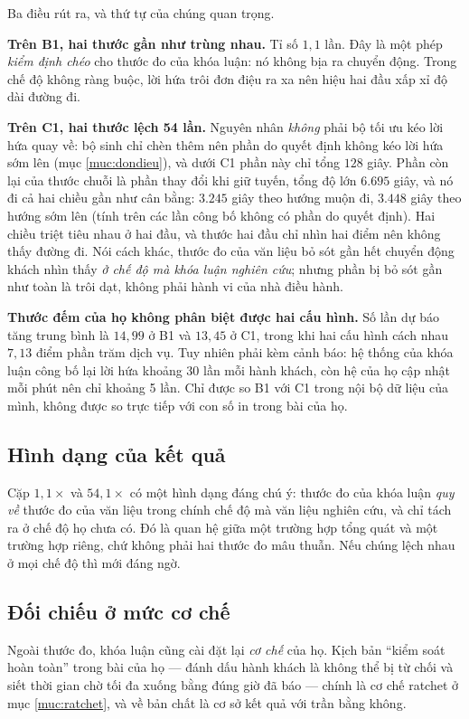 Ba điều rút ra, và thứ tự của chúng quan trọng.

\textbf{Trên B1, hai thước gần như trùng nhau.} Tỉ số $1{,}1$ lần. Đây là một phép \emph{kiểm
định chéo} cho thước đo của khóa luận: nó không bịa ra chuyển động. Trong chế độ không ràng buộc,
lời hứa trôi đơn điệu ra xa nên hiệu hai đầu xấp xỉ độ dài đường đi.

\textbf{Trên C1, hai thước lệch 54 lần.} Nguyên nhân \emph{không} phải bộ tối ưu kéo lời hứa quay
về: bộ sinh chỉ chèn thêm nên phần do quyết định không kéo lời hứa sớm lên (mục \ref{muc:dondieu}),
và dưới C1 phần này chỉ tổng $128$ giây. Phần còn lại của thước chuỗi là phần thay đổi khi giữ
tuyến, tổng độ lớn $6.695$ giây, và nó đi cả hai chiều gần như cân bằng: $3.245$ giây theo hướng
muộn đi, $3.448$ giây theo hướng sớm lên (tính trên các lần công bố không có phần do quyết định).
Hai chiều triệt tiêu nhau ở hai đầu, và thước hai đầu chỉ nhìn hai điểm nên không thấy đường đi.
Nói cách khác, thước đo của văn liệu bỏ sót gần hết chuyển động khách nhìn thấy \emph{ở chế độ mà
khóa luận nghiên cứu}; nhưng phần bị bỏ sót gần như toàn là trôi dạt, không phải hành vi của nhà
điều hành.

\textbf{Thước đếm của họ không phân biệt được hai cấu hình.} Số lần dự báo tăng trung bình là
$14{,}99$ ở B1 và $13{,}45$ ở C1, trong khi hai cấu hình cách nhau $7{,}13$ điểm phần trăm dịch
vụ. Tuy nhiên phải kèm cảnh báo: hệ thống của khóa luận công bố lại lời hứa khoảng 30 lần mỗi
hành khách, còn hệ của họ cập nhật mỗi phút nên chỉ khoảng 5 lần. Chỉ được so B1 với C1 trong
nội bộ dữ liệu của mình, không được so trực tiếp với con số in trong bài của họ.

\subsection{Hình dạng của kết quả}

Cặp $1{,}1\times$ và $54{,}1\times$ có một hình dạng đáng chú ý: thước đo của khóa luận
\emph{quy về} thước đo của văn liệu trong chính chế độ mà văn liệu nghiên cứu, và chỉ tách ra ở
chế độ họ chưa có. Đó là quan hệ giữa một trường hợp tổng quát và một trường hợp riêng, chứ
không phải hai thước đo mâu thuẫn. Nếu chúng lệch nhau ở mọi chế độ thì mới đáng ngờ.

\subsection{Đối chiếu ở mức cơ chế}

Ngoài thước đo, khóa luận cũng cài đặt lại \emph{cơ chế} của họ. Kịch bản ``kiểm soát hoàn
toàn'' trong bài của họ --- đánh dấu hành khách là không thể bị từ chối và siết thời gian chờ
tối đa xuống bằng đúng giờ đã báo --- chính là cơ chế ratchet ở mục \ref{muc:ratchet}, và về bản chất là cơ
sở kết quả với trần bằng không.

